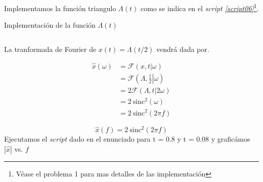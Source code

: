 \documentclass[a4paper,12pt,final]{article}
\begin{document}
      \noindent Implementamos la función triangulo $\Lambda\left(t\right)$
      como se indica en el \emph{script \ref{script06}}\footnote{Véase el
      problema 1 para mas detalles de las implementación}.

      \begin{listing}[H]
        \caption{Implementación de la función $\Lambda\left(t\right)$}
        \label{script06}
        \inputminted{matlab}{./laboratorio_4/triangle.m}
      \end{listing}

      \noindent La tranformada de Fourier de $x\left(t\right) = \Lambda\left(t/2\right)$
      vendrá dada por.

      \begin{equation*}
        \begin{split}
          \widehat{x}\left(\omega\right) & = \mathcal{F}\left(x,t|\omega\right) \\
                                         & = \mathcal{F}\left(\Lambda,\left.\frac{t}{2}\right|\omega\right) \\
                                         & = 2\mathcal{F}\left(\Lambda,t|2\omega\right) \\
                                         & = 2\ \mathrm{sinc}^{2}\left(\omega\right) \\
                                         & = 2\ \mathrm{sinc}^{2}\left(2 \pi f\right)
        \end{split}
      \end{equation*}

      \begin{equation*}
        \widehat{x}\left(f\right) = 2\ \mathrm{sinc}^{2}\left(2 \pi f\right)
      \end{equation*}
      \vfill
      \newpage
      \noindent Ejecutamos el \emph{script} dado en el enunciado para t = 0.8 y t = 0.08
      y graficámos $\left|\hat{x}\right|$ vs. $f$
\end{document}
